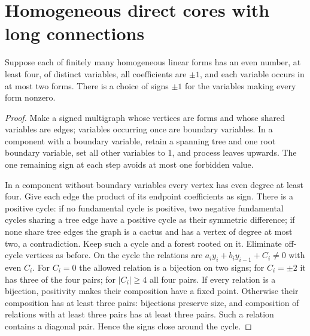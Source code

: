 \section{Homogeneous direct cores with long connections}\label{sec:homogeneous}

\begin{lemma}\label{lem:evenforms}
Suppose each of finitely many homogeneous linear forms has an even
number, at least four, of distinct variables, all coefficients are
$\pm1$, and each variable occurs in at most two forms. There is a
choice of signs $\pm1$ for the variables making every form nonzero.
\end{lemma}
\begin{proof}
Make a signed multigraph whose vertices are forms and whose shared
variables are edges; variables occurring once are boundary variables.
In a component with a boundary variable, retain a spanning tree and
one root boundary variable, set all other variables to 1, and process
leaves upwards. The one remaining sign at each step avoids at most
one forbidden value.

In a component without boundary variables every vertex has even
degree at least four. Give each edge the product of its endpoint
coefficients as sign. There is a positive cycle: if no fundamental
cycle is positive, two negative fundamental cycles sharing a tree
edge have a positive cycle as their symmetric difference; if none
share tree edges the graph is a cactus and has a vertex of degree at
most two, a contradiction. Keep such a cycle and a forest rooted on
it. Eliminate off-cycle vertices as before. On the cycle the relations
are $a_i y_i+b_i y_{i-1}+C_i\ne0$ with even $C_i$.
For $C_i=0$ the allowed relation is a bijection on two signs; for
$C_i=\pm2$ it has three of the four pairs; for $|C_i|\ge4$ all four
pairs. If every relation is a bijection, positivity makes their
composition have a fixed point. Otherwise their composition has at
least three pairs: bijections preserve size, and composition of
relations with at least three pairs has at least three pairs. Such
a relation contains a diagonal pair. Hence the signs close around
the cycle.
\end{proof}

